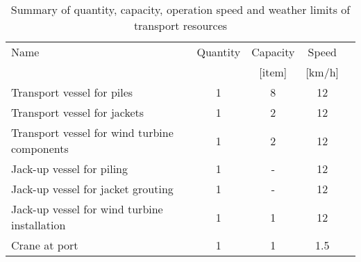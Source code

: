 \begin{table}
\label{tab:input}
\begin{tabular}{lcccc}
\hline 
Name & Quantity & Capacity & Speed \\
 & & [item] & [km/h] \\ 
\hline 
Transport vessel for piles & 1 & 8 & 12 \\ 
Transport vessel for jackets & 1 & 2 & 12 \\ 
Transport vessel for wind turbine components & 1 & 2 & 12 \\ 
Jack-up vessel for piling & 1 & - & 12\\
Jack-up vessel for jacket grouting & 1 & - & 12\\
Jack-up vessel for wind turbine installation & 1 & 1 & 12 \\
Crane at port & 1 & 1 & 1.5 \\
\hline 
\end{tabular}

\caption{Summary of quantity, capacity, operation speed and weather limits of transport resources}
\end{table}
